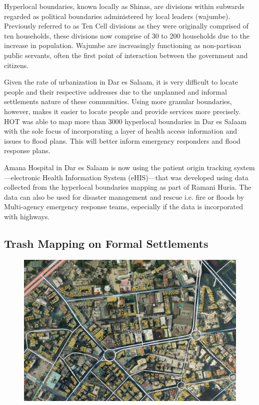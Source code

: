 \documentclass[a4paper,12pt,twoside]{article}
\begin{document}
\begin{multicols}{2}
Hyperlocal boundaries, known locally as Shinas, are divisions within subwards regarded as political boundaries administered by local leaders (wajumbe). Previously referred to as Ten Cell divisions as they were originally comprised of ten households, these divisions now comprise of 30 to 200 households due to the increase in population. Wajumbe are increasingly functioning as non-partisan public servants, often the first point of interaction between the government and citizens.

Given the rate of urbanization in Dar es Salaam, it is very difficult to locate people and their respective addresses due to the unplanned and informal settlements nature of these communities. Using more granular boundaries, however, makes it easier to locate people and provide services more precisely. HOT was able to map more than 3000 hyperlocal boundaries in Dar es Salaam with the sole focus of incorporating a layer of health access information and issues to flood plans. This will better inform emergency responders and flood response plans. 

Amana Hospital in Dar es Salaam is now using the patient origin tracking system---electronic Health Information System (eHIS)---that was developed using data collected from the hyperlocal boundaries mapping as part of Ramani Huria. The data can also be used for disaster management and rescue i.e. fire or floods by Multi-agency emergency response teams, especially if the data is incorporated with highways.
\end{multicols}
\newpage
\subsection{Trash Mapping on Formal Settlements}
\begin{figure}[h]
    \centering
    \includegraphics[width=.8\textwidth]{images/Trashmapsample.jpeg}
    \label{fig:my_label}
\end{figure}
\end{document}
